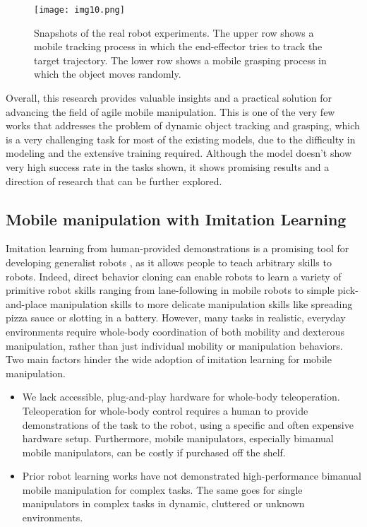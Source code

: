 \begin{figure}[ht]
	\centering
	\texttt{[image: img10.png]}
	\captionsetup{width=1\linewidth}
	\caption{Snapshots of the real robot experiments. The upper row shows a mobile
		tracking process in which the end-effector tries to track the target trajectory.
		The lower row shows a mobile grasping process in which the object moves
		randomly. \cite{wang2022multitask}}
	\label{fig:img10}
\end{figure}

Overall, this research provides valuable insights and a practical solution for advancing the
field of agile mobile manipulation. This is one of the very few works that addresses the
problem of dynamic object tracking and grasping, which is a very challenging task for most
of the existing models, due to the difficulty in modeling and the extensive training required. Although
the model doesn't show very high success rate in the tasks shown, it shows promising results
and a direction of research that can be further explored.


\subsection{Mobile manipulation with Imitation Learning}

Imitation learning from human-provided demonstrations is a promising tool for developing generalist
robots \cite{tony2024mobile}, as it allows people to teach arbitrary skills to robots.
Indeed, direct behavior cloning can enable robots to learn a variety of primitive robot skills
ranging from lane-following in mobile robots to simple pick-and-place manipulation skills
to more delicate manipulation skills like spreading pizza sauce or slotting in a battery.
However, many tasks in realistic, everyday environments require whole-body coordination of both mobility
and dexterous manipulation, rather than just individual mobility or manipulation behaviors.
Two main factors hinder the wide adoption of imitation learning for mobile manipulation.

\begin{itemize}
	\item We lack accessible, plug-and-play hardware for whole-body teleoperation. Teleoperation
	      for whole-body control requires a human to provide demonstrations of the task to the robot,
	      using a specific and often expensive hardware setup. Furthermore, mobile manipulators,
	      especially bimanual mobile manipulators, can be costly if purchased off the shelf.
	\item Prior robot learning works have not demonstrated high-performance bimanual mobile manipulation
	      for complex tasks. The same goes for single manipulators in complex tasks in dynamic,
	      cluttered or unknown environments.
\end{itemize}


